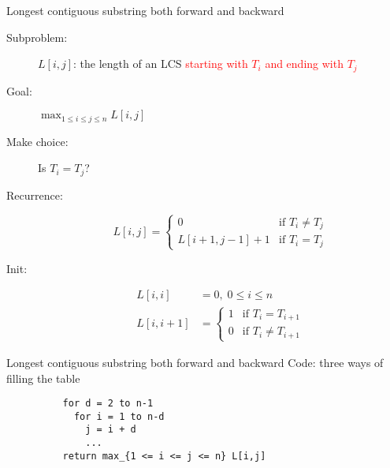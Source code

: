 \begin{frame}{Longest contiguous substring both forward and backward}
  \begin{description}
	\item[Subproblem:] $L[i,j]$: the length of an LCS \textcolor{red}{starting with $T_{i}$ and ending with $T_{j}$}
	\item[Goal:] $\max_{1 \le i \le j \le n} L[i,j]$
	  \pause
	\item[Make choice:] Is $T_{i} = T_{j}$?
	\item[Recurrence:] 
	  \begin{displaymath}
		L[i,j] = \left\{ \begin{array}{ll}
		  0 & \textrm{if $T_{i} \neq T_{j}$}  \\
		  L[i+1,j-1] + 1 & \textrm{if $T_{i} = T_{j}$}
		\end{array} \right.
	  \end{displaymath}
	  \pause
	\item[Init:]
	  \begin{align*}
		L[i,i] &= 0, \; 0 \le i \le n  \\
		L[i,i+1] &= \left\{ \begin{array}{ll}
		  1 & \text{if } T_{i} = T_{i+1}  \\
		  0 & \text{if } T_{i} \neq T_{i+1}
		  \end{array} \right.
	  \end{align*}
  \end{description}
\end{frame}
\begin{frame}[fragile]{Longest contiguous substring both forward and backward}
  Code: three ways of filling the table

    \begin{center}
        \begin{verbatim}
          for d = 2 to n-1
            for i = 1 to n-d
              j = i + d
              ...
          return max_{1 <= i <= j <= n} L[i,j]
       \end{verbatim}
    \end{center}
\end{frame}
